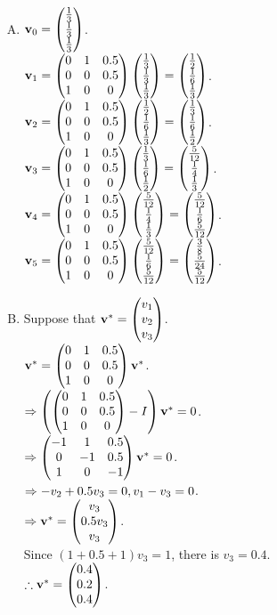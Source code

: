 \renewcommand{\u}{\mathbf{u}}
\renewcommand{\v}{\mathbf{v}}

\begin{pr}$ $
\renewcommand{\P}{\matrix{0&1&0.5\\0&0&0.5\\1&0&0}}
\newcommand{\va}{\matrix{\frac13\\\frac13\\\frac13}}
\newcommand{\vb}{\matrix{\frac12\\\frac16\\\frac13}}
\newcommand{\vc}{\matrix{\frac13\\\frac16\\\frac12}}
\newcommand{\vd}{\matrix{\frac5{12}\\\frac14\\\frac13}}
\newcommand{\ve}{\matrix{\frac5{12}\\\frac16\\\frac5{12}}}
\newcommand{\vf}{\matrix{\frac38\\\frac5{24}\\\frac5{12}}}
\begin{enumerate}[(A)]
\item $\v_0=\va$.\\
$\v_1=\P\va=\vb$.\\
$\v_2=\P\vb=\vc$.\\
$\v_3=\P\vc=\vd$.\\
$\v_4=\P\vd=\ve$.\\
$\v_5=\P\ve=\vf$.
\item Suppose that $\v^*=\matrix{v_1\\v_2\\v_3}$.\\
$\v^*=\P\v^*$.\\
$\then\left(\P-I\right)\v^*=0$.\\
$\then\matrix{-1&1&0.5\\0&-1&0.5\\1&0&-1}\v^*=0$.\\
$\Rightarrow-v_2+0.5v_3=0, v_1-v_3=0$.\\
$\then\v^*=\matrix{v_3\\0.5v_3\\v_3}$.\\
Since $(1+0.5+1)v_3=1$, there is $v_3=0.4$.\\
$\so\v^*=\matrix{0.4\\0.2\\0.4}$.
\end{enumerate}
\end{pr}
